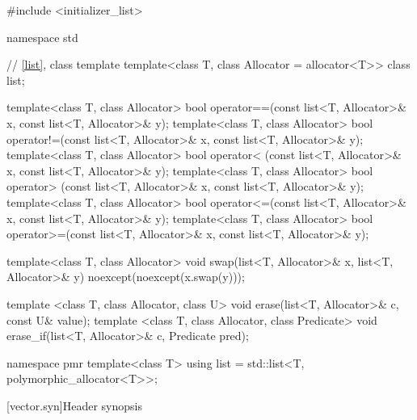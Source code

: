 \begin{codeblock}
#include <initializer_list>

namespace std {
  // \ref{list}, class template 
  template<class T, class Allocator = allocator<T>> class list;

  template<class T, class Allocator>
    bool operator==(const list<T, Allocator>& x, const list<T, Allocator>& y);
  template<class T, class Allocator>
    bool operator!=(const list<T, Allocator>& x, const list<T, Allocator>& y);
  template<class T, class Allocator>
    bool operator< (const list<T, Allocator>& x, const list<T, Allocator>& y);
  template<class T, class Allocator>
    bool operator> (const list<T, Allocator>& x, const list<T, Allocator>& y);
  template<class T, class Allocator>
    bool operator<=(const list<T, Allocator>& x, const list<T, Allocator>& y);
  template<class T, class Allocator>
    bool operator>=(const list<T, Allocator>& x, const list<T, Allocator>& y);

  template<class T, class Allocator>
    void swap(list<T, Allocator>& x, list<T, Allocator>& y)
      noexcept(noexcept(x.swap(y)));

  template <class T, class Allocator, class U>
    void erase(list<T, Allocator>& c, const U& value);
  template <class T, class Allocator, class Predicate>
    void erase_if(list<T, Allocator>& c, Predicate pred);

  namespace pmr {
    template<class T>
      using list = std::list<T, polymorphic_allocator<T>>;
  }
}
\end{codeblock}

[vector.syn]{Header  synopsis}

%

